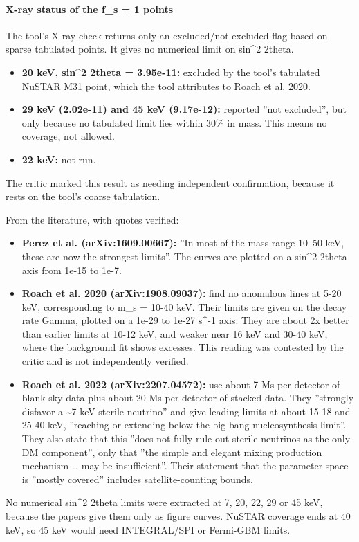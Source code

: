 \documentclass[11pt,a4paper]{article}
\begin{document}
\paragraph{X-ray status of the f\_s = 1 points}
The tool's X-ray check returns only an excluded/not-excluded flag based on sparse tabulated points. It gives no numerical limit on sin\textasciicircum{}2 2theta.

\begin{itemize}
  \item \textbf{20 keV, sin\textasciicircum{}2 2theta = 3.95e-11:} excluded by the tool's tabulated NuSTAR M31 point, which the tool attributes to Roach et al. 2020.
  \item \textbf{29 keV (2.02e-11) and 45 keV (9.17e-12):} reported ''not excluded'', but only because no tabulated limit lies within 30\% in mass. This means no coverage, not allowed.
  \item \textbf{22 keV:} not run.
\end{itemize}
The critic marked this result as needing independent confirmation, because it rests on the tool's coarse tabulation.

From the literature, with quotes verified:

\begin{itemize}
  \item \textbf{Perez et al. (arXiv:1609.00667):} ''In most of the mass range 10--50 keV, these are now the strongest limits''. The curves are plotted on a sin\textasciicircum{}2 2theta axis from 1e-15 to 1e-7.
  \item \textbf{Roach et al. 2020 (arXiv:1908.09037):} find no anomalous lines at 5-20 keV, corresponding to m\_s = 10-40 keV. Their limits are given on the decay rate Gamma, plotted on a 1e-29 to 1e-27 s\textasciicircum{}-1 axis. They are about 2x better than earlier limits at 10-12 keV, and weaker near 16 keV and 30-40 keV, where the background fit shows excesses. This reading was contested by the critic and is not independently verified.
  \item \textbf{Roach et al. 2022 (arXiv:2207.04572):} use about 7 Ms per detector of blank-sky data plus about 20 Ms per detector of stacked data. They ''strongly disfavor a \textasciitilde{}7-keV sterile neutrino'' and give leading limits at about 15-18 and 25-40 keV, ''reaching or extending below the big bang nucleosynthesis limit''. They also state that this ''does not fully rule out sterile neutrinos as the only DM component'', only that ''the simple and elegant mixing production mechanism \ldots{} may be insufficient''. Their statement that the parameter space is ''mostly covered'' includes satellite-counting bounds.
\end{itemize}
No numerical sin\textasciicircum{}2 2theta limits were extracted at 7, 20, 22, 29 or 45 keV, because the papers give them only as figure curves. NuSTAR coverage ends at 40 keV, so 45 keV would need INTEGRAL/SPI or Fermi-GBM limits.
\end{document}
